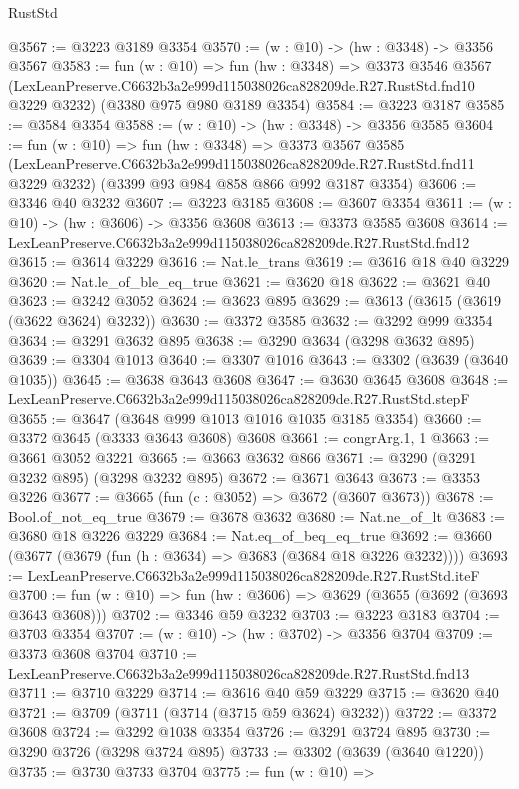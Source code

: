 \begin{lexlean}{RustStd}
\begin{coremodule}
@3567 := @3223 @3189 @3354
@3570 := (w : @10) -> (hw : @3348) -> @3356 @3567
@3583 := fun (w : @10) =>
  fun (hw : @3348) =>
  @3373
    @3546
    @3567
    (LexLeanPreserve.C6632b3a2e999d115038026ca828209de.R27.RustStd.fnd10 @3229 @3232)
    (@3380 @975 @980 @3189 @3354)
@3584 := @3223 @3187
@3585 := @3584 @3354
@3588 := (w : @10) -> (hw : @3348) -> @3356 @3585
@3604 := fun (w : @10) =>
  fun (hw : @3348) =>
  @3373
    @3567
    @3585
    (LexLeanPreserve.C6632b3a2e999d115038026ca828209de.R27.RustStd.fnd11 @3229 @3232)
    (@3399 @93 @984 @858 @866 @992 @3187 @3354)
@3606 := @3346 @40 @3232
@3607 := @3223 @3185
@3608 := @3607 @3354
@3611 := (w : @10) -> (hw : @3606) -> @3356 @3608
@3613 := @3373 @3585 @3608
@3614 := LexLeanPreserve.C6632b3a2e999d115038026ca828209de.R27.RustStd.fnd12
@3615 := @3614 @3229
@3616 := Nat.le_trans
@3619 := @3616 @18 @40 @3229
@3620 := Nat.le_of_ble_eq_true
@3621 := @3620 @18
@3622 := @3621 @40
@3623 := @3242 @3052
@3624 := @3623 @895
@3629 := @3613 (@3615 (@3619 (@3622 @3624) @3232))
@3630 := @3372 @3585
@3632 := @3292 @999 @3354
@3634 := @3291 @3632 @895
@3638 := @3290 @3634 (@3298 @3632 @895)
@3639 := @3304 @1013
@3640 := @3307 @1016
@3643 := @3302 (@3639 (@3640 @1035))
@3645 := @3638 @3643 @3608
@3647 := @3630 @3645 @3608
@3648 := LexLeanPreserve.C6632b3a2e999d115038026ca828209de.R27.RustStd.stepF
@3655 := @3647 (@3648 @999 @1013 @1016 @1035 @3185 @3354)
@3660 := @3372 @3645 (@3333 @3643 @3608) @3608
@3661 := congrArg.{1, 1}
@3663 := @3661 @3052 @3221
@3665 := @3663 @3632 @866
@3671 := @3290 (@3291 @3232 @895) (@3298 @3232 @895)
@3672 := @3671 @3643
@3673 := @3353 @3226
@3677 := @3665 (fun (c : @3052) => @3672 (@3607 @3673))
@3678 := Bool.of_not_eq_true
@3679 := @3678 @3632
@3680 := Nat.ne_of_lt
@3683 := @3680 @18 @3226 @3229
@3684 := Nat.eq_of_beq_eq_true
@3692 := @3660 (@3677 (@3679 (fun (h : @3634) => @3683 (@3684 @18 @3226 @3232))))
@3693 := LexLeanPreserve.C6632b3a2e999d115038026ca828209de.R27.RustStd.iteF
@3700 := fun (w : @10) => fun (hw : @3606) => @3629 (@3655 (@3692 (@3693 @3643 @3608)))
@3702 := @3346 @59 @3232
@3703 := @3223 @3183
@3704 := @3703 @3354
@3707 := (w : @10) -> (hw : @3702) -> @3356 @3704
@3709 := @3373 @3608 @3704
@3710 := LexLeanPreserve.C6632b3a2e999d115038026ca828209de.R27.RustStd.fnd13
@3711 := @3710 @3229
@3714 := @3616 @40 @59 @3229
@3715 := @3620 @40
@3721 := @3709 (@3711 (@3714 (@3715 @59 @3624) @3232))
@3722 := @3372 @3608
@3724 := @3292 @1038 @3354
@3726 := @3291 @3724 @895
@3730 := @3290 @3726 (@3298 @3724 @895)
@3733 := @3302 (@3639 (@3640 @1220))
@3735 := @3730 @3733 @3704
@3775 := fun (w : @10) =>

\end{coremodule}
\end{lexlean}
